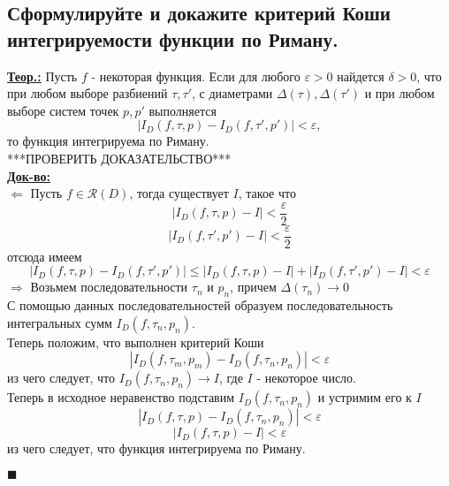 
\subsection{Сформулируйте и докажите критерий Коши интегрируемости функции по Риману.}

\textbf{\underline{Теор.:} } Пусть $f$ - некоторая функция. Если для любого $\varepsilon > 0$ найдется $\delta > 0$, что при любом выборе разбиений $\tau, \tau'$, с диаметрами $\Delta(\tau), \Delta(\tau')$ и при любом выборе систем точек $p, p'$ выполняется 
\[|I_D(f, \tau, p) - I_D(f, \tau', p')| < \varepsilon,\]
то функция интегрируема по Риману.\\
***ПРОВЕРИТЬ ДОКАЗАТЕЛЬСТВО*** \\
\textbf{\underline{Док-во:} } \\
$\Leftarrow$ Пусть $f \in \mathcal{R}(D)$, тогда существует $I$, такое что 
\[|I_D(f, \tau, p) - I| < \frac{\varepsilon}{2}\]
\[|I_D(f, \tau', p') - I| < \frac{\varepsilon}{2}\]
отсюда имеем
\[|I_D(f, \tau, p) - I_D(f, \tau', p')| \leq |I_D(f, \tau, p) - I| + |I_D(f, \tau', p') - I| < \varepsilon\]
$\Rightarrow$ Возьмем последовательности $\tau_n$ и $p_n$, причем $\Delta(\tau_n) \rightarrow 0$ \\
С помощью данных последовательностей образуем последовательность интегральных сумм $I_D(f, \tau_n, p_n)$. \\
Теперь положим, что выполнен критерий Коши
\[|I_D(f, \tau_m, p_m) - I_D(f, \tau_n, p_n)| < \varepsilon\]
из чего следует, что $I_D(f, \tau_n, p_n) \rightarrow I$, где $I$ - некоторое число. \\
Теперь в исходное неравенство подставим $I_D(f, \tau_n, p_n)$ и устримим его к $I$
\[|I_D(f, \tau, p) - I_D(f, \tau_n, p_n)| < \varepsilon\]
\[|I_D(f, \tau, p) - I| < \varepsilon\] 
из чего следует, что функция интегрируема по Риману.
\begin{flushright}
$\blacksquare$
\end{flushright}


